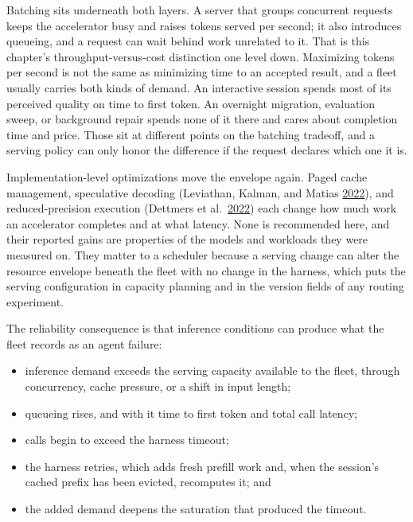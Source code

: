 Batching sits underneath both layers. A server that groups concurrent requests keeps the accelerator busy and raises tokens served per second; it also introduces queueing, and a request can wait behind work unrelated to it. That is this chapter's throughput-versus-cost distinction one level down. Maximizing tokens per second is not the same as minimizing time to an accepted result, and a fleet usually carries both kinds of demand. An interactive session spends most of its perceived quality on time to first token. An overnight migration, evaluation sweep, or background repair spends none of it there and cares about completion time and price. Those sit at different points on the batching tradeoff, and a serving policy can only honor the difference if the request declares which one it is.

Implementation-level optimizations move the envelope again. Paged cache management, speculative decoding (Leviathan, Kalman, and Matias \href{https://arxiv.org/abs/2211.17192}{2022}), and reduced-precision execution (Dettmers et al.~\href{https://arxiv.org/abs/2208.07339}{2022}) each change how much work an accelerator completes and at what latency. None is recommended here, and their reported gains are properties of the models and workloads they were measured on. They matter to a scheduler because a serving change can alter the resource envelope beneath the fleet with no change in the harness, which puts the serving configuration in capacity planning and in the version fields of any routing experiment.


The reliability consequence is that inference conditions can produce what the fleet records as an agent failure:

\begin{itemize}
\tightlist
\item
  inference demand exceeds the serving capacity available to the fleet, through concurrency, cache pressure, or a shift in input length;
\item
  queueing rises, and with it time to first token and total call latency;
\item
  calls begin to exceed the harness timeout;
\item
  the harness retries, which adds fresh prefill work and, when the session's cached prefix has been evicted, recomputes it; and
\item
  the added demand deepens the saturation that produced the timeout.
\end{itemize}

